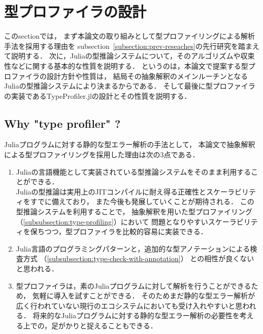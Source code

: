 
\section{型プロファイラの設計} \label{section:3}

このsectionでは，
まず本論文の取り組みとして型プロファイリングによる解析手法を採用する理由を
subsection~\ref{subsection:prev-reseaches}の先行研究を踏まえて説明する．
次に，Juliaの型推論システムについて，そのアルゴリズムや収束性などに関する基本的な性質を説明する．
というのは，本論文で提案する型プロファイラの設計方針や性質は，
結局その抽象解釈のメインルーチンとなるJuliaの型推論システムにより決まるからである．
そして最後に型プロファイラの実装であるTypeProfiler.jlの設計とその性質を説明する．

\subsection{Why "type profiler" ?}

Juliaプログラムに対する静的な型エラー解析の手法として，
本論文で抽象解釈による型プロファイリングを採用した理由は次の3点である．

\begin{enumerate}
  \item Juliaの言語機能として実装されている型推論システムをそのまま利用することができる．\\
        Juliaの型推論は実用上のJITコンパイルに耐え得る正確性とスケーラビリティをすでに備えており，
        また今後も発展していくことが期待される．
        この型推論システムを利用することで，
        抽象解釈を用いた型プロファイリング（\ref{subsubsection:type-profiling}）において
        問題となりやすいスケーラビリティを保ちつつ，型プロファイラを比較的容易に実装できる．
　\item Julia言語のプログラミングパターンと，追加的な型アノテーションによる検査方式
        （\ref{subsubsection:type-check-with-annotation}）
        との相性が良くないと思われる．
  \item 型プロファイラは，素のJuliaプログラムに対して解析を行うことができるため，
        気軽に導入を試すことができる．
        そのためまだ静的な型エラー解析が広く行われていない現行のエコシステムにおいても受け入れやすいと思われる．
        将来的なJuliaプログラムに対する静的な型エラー解析の必要性を考える上での，足がかりと捉えることもできる．
\end{enumerate}

